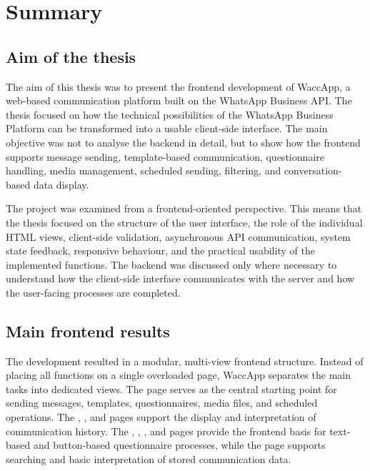 \chapter{Summary}

\section{Aim of the thesis}

The aim of this thesis was to present the frontend development of WaccApp, a web-based communication platform built on the WhatsApp Business API. The thesis focused on how the technical possibilities of the WhatsApp Business Platform can be transformed into a usable client-side interface. The main objective was not to analyse the backend in detail, but to show how the frontend supports message sending, template-based communication, questionnaire handling, media management, scheduled sending, filtering, and conversation-based data display. 

The project was examined from a frontend-oriented perspective. This means that the thesis focused on the structure of the user interface, the role of the individual HTML views, client-side validation, asynchronous API communication, system state feedback, responsive behaviour, and the practical usability of the implemented functions. The backend was discussed only where necessary to understand how the client-side interface communicates with the server and how the user-facing processes are completed. 

\section{Main frontend results}

The development resulted in a modular, multi-view frontend structure. Instead of placing all functions on a single overloaded page, WaccApp separates the main tasks into dedicated views. The  page serves as the central starting point for sending messages, templates, questionnaires, media files, and scheduled operations. The , , and  pages support the display and interpretation of communication history. The , , , and  pages provide the frontend basis for text-based and button-based questionnaire processes, while the  page supports searching and basic interpretation of stored communication data. 

